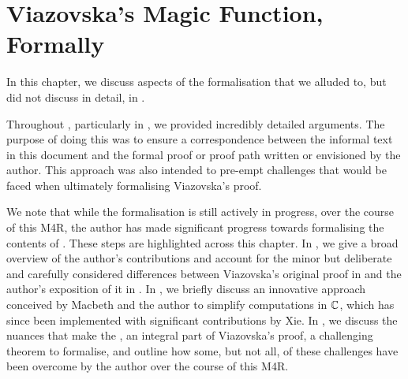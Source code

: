 \chapter{Viazovska's Magic Function, Formally}
\label{Ch5:Chapter}
\thispagestyle{empty}

In this chapter, we discuss aspects of the formalisation that we alluded to, but did not discuss in detail, in .

Throughout , particularly in , we provided incredibly detailed arguments. The purpose of doing this was to ensure a correspondence between the informal text in this document and the formal proof or proof path written or envisioned by the author. This approach was also intended to pre-empt challenges that would be faced when ultimately formalising Viazovska's proof.

We note that while the formalisation is still actively in progress, over the course of this M4R, the author has made significant progress towards formalising the contents of . These steps are highlighted across this chapter. In , we give a broad overview of the author's contributions and account for the minor but deliberate and carefully considered differences between Viazovska's original proof in \cite{Viazovska8} and the author's exposition of it in .  In , we briefly discuss an innovative approach conceived by Macbeth and the author to simplify computations in $\mathbb{C}$, which has since been implemented with significant contributions by Xie. In , we discuss the nuances that make the \CGT, an integral part of Viazovska's proof, a challenging theorem to formalise, and outline how some, but not all, of these challenges have been overcome by the author over the course of this M4R.



